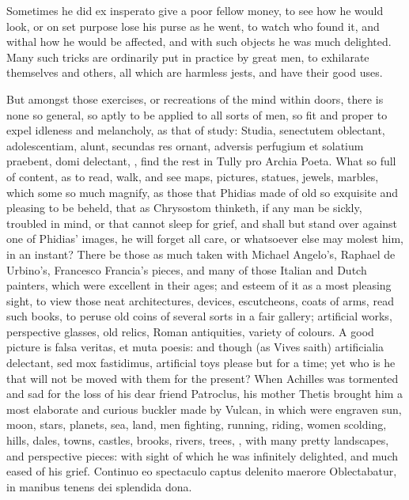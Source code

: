 {Sometimes he did ex insperato give a poor fellow money, to see how he
would look, or on set purpose lose his purse as he went, to watch who
found it, and withal how he would be affected, and with such objects he
was much delighted. Many such tricks are ordinarily put in practice by
great men, to exhilarate themselves and others, all which are harmless
jests, and have their good uses.

But amongst those exercises, or recreations of the mind within doors,
there is none so general, so aptly to be applied to all sorts of men,
so fit and proper to expel idleness and melancholy, as that of study:
Studia, senectutem oblectant, adolescentiam, alunt, secundas res
ornant, adversis perfugium et solatium praebent, domi delectant, \etc{},
find the rest in Tully pro Archia Poeta. What so full of content,
as to read, walk, and see maps, pictures, statues, jewels, marbles,
which some so much magnify, as those that Phidias made of old so
exquisite and pleasing to be beheld, that as Chrysostom thinketh,
if any man be sickly, troubled in mind, or that cannot sleep for grief,
and shall but stand over against one of Phidias' images, he will forget
all care, or whatsoever else may molest him, in an instant? There be
those as much taken with Michael Angelo's, Raphael de Urbino's,
Francesco Francia's pieces, and many of those Italian and Dutch
painters, which were excellent in their ages; and esteem of it as a
most pleasing sight, to view those neat architectures, devices,
escutcheons, coats of arms, read such books, to peruse old coins of
several sorts in a fair gallery; artificial works, perspective glasses,
old relics, Roman antiquities, variety of colours. A good picture is
falsa veritas, et muta poesis: and though (as Vives saith)
artificialia delectant, sed mox fastidimus, artificial toys please but
for a time; yet who is he that will not be moved with them for the
present? When Achilles was tormented and sad for the loss of his dear
friend Patroclus, his mother Thetis brought him a most elaborate and
curious buckler made by Vulcan, in which were engraven sun, moon,
stars, planets, sea, land, men fighting, running, riding, women
scolding, hills, dales, towns, castles, brooks, rivers, trees, \etc{},
with many pretty landscapes, and perspective pieces: with sight of
which he was infinitely delighted, and much eased of his grief.
Continuo eo spectaculo captus delenito maerore
Oblectabatur, in manibus tenens dei splendida dona.

}
